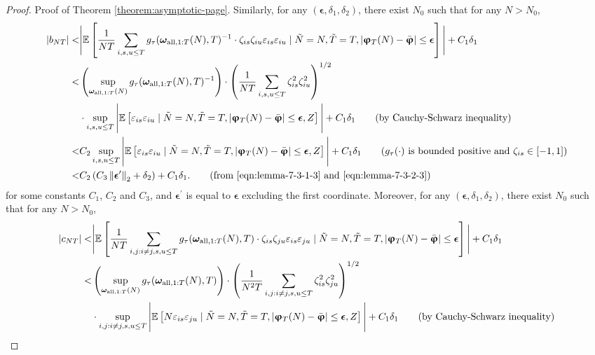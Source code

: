 \begin{proof}{Proof of Theorem \ref{theorem:asymptotic-page}.}
Similarly, for any $(\bm\epsilon, \delta_1, \delta_2)$, there exist $N_0$ such that for any $N > N_0$,
\begin{align*}
    |b_{NT}| <& \Bigg|\+E \left[ \frac{1}{NT} \sum_{i,s,u\leq T} \funfrac(\bm{\omega}_{\all,1:T}(N),T)^\I \cdot   \zeta_{is} \zeta_{iu} \varepsilon_{is} \varepsilon_{iu} \mid \tilde{N} = N, \tilde{T} = T, |\bm{\upvarphi}_T(N) - \bar{\bm{\upvarphi}}|  \leq  \bm\epsilon \right]\Bigg|  + C_1 \delta_1 \\
    <& \left( \sup_{\bm{\omega}_{\all,1:T}(N)}  \funfrac(\bm{\omega}_{\all,1:T}(N),T)^\I \right) \cdot \left(\frac{1}{NT} \sum_{i,s,u\leq T}  \zeta^2_{is} \zeta^2_{iu} \right)^{1/2} \\
    & \cdot \sup_{i,s,u\leq T} \Bigg|\+E \left[ \varepsilon_{is} \varepsilon_{iu} \mid \tilde{N} = N, \tilde{T} = T, |\bm{\upvarphi}_T(N) - \bar{\bm{\upvarphi}}|  \leq  \bm\epsilon, Z \right]\Bigg|  + C_1 \delta_1 \tag{by Cauchy-Schwarz inequality} \\
    <& C_2 \sup_{i,s,u\leq T} \Bigg|\+E \left[ \varepsilon_{is} \varepsilon_{iu} \mid \tilde{N} = N, \tilde{T} = T, |\bm{\upvarphi}_T(N) - \bar{\bm{\upvarphi}}|  \leq  \bm\epsilon, Z \right]\Bigg|  + C_1 \delta_1 \tag{$g_\tau(\cdot)$ is bounded positive and $\zeta_{is} \in [-1,1]$} \\
    <& C_2 \left(C_3 \norm{{\bm{\epsilon}}^\prime}_2  + \delta_2\right) + C_1 \delta_1. \tag{from \eqref{eqn:lemma-7-3-1-3} and \eqref{eqn:lemma-7-3-2-3}}
\end{align*}
for some constants $C_1$, $C_2$ and $C_3$, and ${\bm{\epsilon}}^\prime$ is equal to ${\bm{\epsilon}}$ excluding the first coordinate. 
Moreover, for any $(\bm\epsilon, \delta_1, \delta_2)$, there exist $N_0$ such that for any $N > N_0$,
\begin{align*}
    |c_{NT}| <& \Bigg|\+E \left[ \frac{1}{NT} \sum_{i,j:i\neq j,s,u\leq T} \funfrac(\bm{\omega}_{\all,1:T}(N),T) \cdot   \zeta_{is} \zeta_{ju} \varepsilon_{is} \varepsilon_{ju} \mid \tilde{N} = N, \tilde{T} = T, |\bm{\upvarphi}_T(N) - \bar{\bm{\upvarphi}}|  \leq  \bm\epsilon \right]\Bigg|  + C_1 \delta_1 \\
    <& \left( \sup_{\bm{\omega}_{\all,1:T}(N)}  \funfrac(\bm{\omega}_{\all,1:T}(N),T) \right) \cdot \left(\frac{1}{N^2 T} \sum_{i,j:i\neq j,s,u\leq T}  \zeta^2_{is} \zeta^2_{ju} \right)^{1/2} \\
    & \cdot \sup_{i,j:i\neq j,s,u\leq T} \Bigg|\+E \left[ N\varepsilon_{is} \varepsilon_{ju} \mid \tilde{N} = N, \tilde{T} = T, |\bm{\upvarphi}_T(N) - \bar{\bm{\upvarphi}}|  \leq  \bm\epsilon, Z \right]\Bigg|  + C_1 \delta_1 \tag{by Cauchy-Schwarz inequality} \\

\end{align*}
\end{proof}
